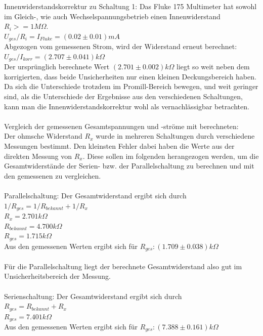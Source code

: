 \documentclass[12pt,a4paper]{article}
\begin{document}
\begin{multicols}{2}
Innenwiderstandskorrektur zu Schaltung 1: Das Fluke 175 Multimeter hat sowohl im Gleich-, wie auch Wechselspannungsbetrieb einen Innenwiderstand $R_{i} >= 1M\Omega$.\\
$U_{ges}/R_{i}= I_{Fluke} = (0.02 \pm 0.01) mA$\\
Abgezogen vom gemessenen Strom, wird der Widerstand erneut berechnet:\\
$U_{ges}/I_{korr}= (2.707 \pm 0.041) k\Omega$\\
Der ursprünglich berechnete Wert $(2.701 \pm 0.002) k\Omega$ liegt so weit neben dem korrigierten, dass beide Unsicherheiten nur einen kleinen Deckungsbereich haben. Da sich die Unterschiede trotzdem im Promill-Bereich bewegen, und weit geringer sind, als die Unterschiede der Ergebnisse aus den verschiedenen Schaltungen, kann man die Innenwiderstandskorrektur wohl als vernachlässigbar betrachten.\\
\\
Vergleich der gemessenen Gesamtspannungen und -ströme mit berechneten:\\
Der ohmsche Widerstand $R_{x}$ wurde in mehreren Schaltungen durch verschiedene Messungen bestimmt. Den kleinsten Fehler dabei haben die Werte aus der direkten Messung von $R_{x}$. Diese sollen im folgenden herangezogen werden, um die Gesamtwiderstände der Serien- bzw. der Parallelschaltung zu berechnen und mit den gemessenen zu vergleichen.\\
\\
Parallelschaltung: Der Gesamtwiderstand ergibt sich durch\\
$1/R_{ges} = 1/R_{bekannt} + 1/R_{x}$\\
$R_{x} = 2.701 k\Omega$\\
$R_{bekannt} = 4.700 k\Omega$\\
$R_{ges} = 1.715 k\Omega$\\
Aus den gemessenen Werten ergibt sich für $R_{ges}: (1.709 \pm 0.038) k\Omega$\\
\\
Für die Parallelschaltung liegt der berechnete Gesamtwiderstand also gut im Unsicherheitsbereich der Messung.\\
\\
Serienschaltung: Der Gesamtwiderstand ergibt sich durch\\
$R_{ges} = R_{bekannt} + R_{x}$\\
$R_{ges} = 7.401 k\Omega$\\
Aus den gemessenen Werten ergibt sich für $R_{ges}: (7.388 \pm 0.161) k\Omega$\\

\end{multicols}
\end{document}
